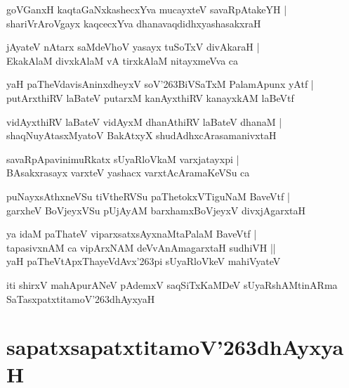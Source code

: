 \documentclass[twoside,12pt,openright]{book}
\def\S{\char'263}
\newcounter{shloka}[chapter]
\begin{document}
\begin{shloka}%
goVGanxH kaqtaGaNxkashecxYva mucayxteV savaRpAtakeYH |\\
shariVrAroVgayx kaqcecxYva dhanavaqdidhxyashasakxraH 
\end{shloka}

\begin{shloka}%
jAyateV nAtarx saMdeVhoV yasayx tuSoTxV divAkaraH |\\
EkakAlaM divxkAlaM vA tirxkAlaM nitayxmeVva ca 
\end{shloka}

\begin{shloka}%
yaH paTheVdavisAninxdheyxV soV\S BiVSaTxM PalamApunx yAtf |\\
putArxthiRV laBateV putarxM kanAyxthiRV kanayxkAM laBeVtf
\end{shloka}

\begin{shloka}%
vidAyxthiRV laBateV vidAyxM dhanAthiRV laBateV dhanaM |\\
shaqNuyAtasxMyatoV BakAtxyX shudAdhxcArasamanivxtaH 	
\end{shloka}

\begin{shloka}%
savaRpApavinimuRkatx sUyaRloVkaM varxjatayxpi |\\
BAsakxrasayx  varxteV yashacx varxtAcAramaKeVSu ca 
\end{shloka}

\begin{shloka}%
puNayxsAthxneVSu tiVtheRVSu paThetokxVTiguNaM BaveVtf |\\
garxheV BoVjeyxVSu pUjAyAM barxhamxBoVjeyxV divxjAgarxtaH 
\end{shloka}

\begin{shloka}%
ya idaM paThateV viparxsatxsAyxnaMtaPalaM BaveVtf |\\
tapasivxnAM ca vipArxNAM deVvAnAmagarxtaH sudhiVH ||\\
yaH paTheVtApxThayeVdAvx\S pi sUyaRloVkeV mahiVyateV 
\end{shloka}

\begin{center}
iti shirxV mahApurANeV pAdemxV saqSiTxKaMDeV sUyaRshAMtinARma SaTasxpatxtitamoV\S dhAyxyaH
\end{center}

\chapter{sapatxsapatxtitamoV\S dhAyxyaH}
\end{document}
